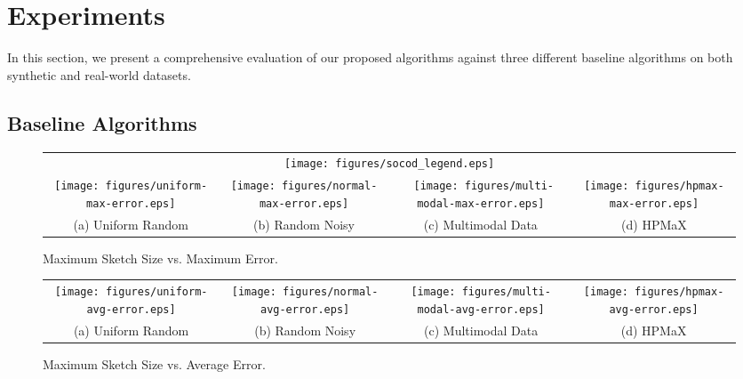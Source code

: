\section{Experiments}
\label{sec:sec-Experiment}

In this section, we present a comprehensive evaluation of our proposed algorithms against three different baseline algorithms on both synthetic and real-world datasets. 



\subsection{Baseline Algorithms}


\begin{figure*}[t]
	\centering
		\begin{tabular}{cccc}
	 			\multicolumn{4}{c}{\hspace{-8mm} \texttt{[image: figures/socod\_legend.eps]}}   \\[-1mm]
                 \texttt{[image: figures/uniform-max-error.eps]} &
			 \texttt{[image: figures/normal-max-error.eps]} &
			\ \texttt{[image: figures/multi-modal-max-error.eps]} &
			 \texttt{[image: figures/hpmax-max-error.eps]}
			\\[-3mm]
             (a) Uniform Random &
                 (b) Random Noisy &
			 (c) Multimodal Data &
			 (d) HPMaX  \\[-1mm]
		\end{tabular}
		\vspace{-3mm}
		\caption{Maximum Sketch Size vs. Maximum Error.} \label{fig:max-error}
		\vspace{-1mm}
\end{figure*}

\begin{figure*}[t]
	\centering
 \vspace{-2mm}
		\begin{tabular}{cccc}
			\texttt{[image: figures/uniform-avg-error.eps]} &
             \texttt{[image: figures/normal-avg-error.eps]} &
			 \texttt{[image: figures/multi-modal-avg-error.eps]} &
			 \texttt{[image: figures/hpmax-avg-error.eps]}
			\\[-3mm]
                 (a) Uniform Random &
                (b) Random Noisy &
			 (c) Multimodal Data &
			 (d) HPMaX  \\[-1mm]
		\end{tabular}
		\vspace{-3mm}
		\caption{Maximum Sketch Size vs. Average Error.} \label{fig:avg-error}
\end{figure*}

